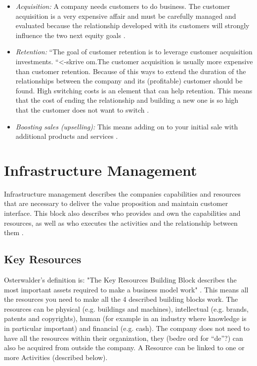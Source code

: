 \begin{itemize}
\renewcommand{\labelitemi}{$\bullet$}
\item \emph{Acquisition:} A company needs customers to do business. The customer acquisition is a very expensive affair and must be carefully managed and evaluated because the relationship developed with its customers will strongly influence the two next equity goals \cite{osterwalderthesis}.
\item \emph{Retention:} “The goal of customer retention is to leverage customer acquisition investments. “<-skrive om.The customer acquisition is usually more expensive than customer retention. Because of this ways to extend the duration of the relationships between the company and its (profitable) customer should be found. High switching costs is an element that can help retention. This means that the cost of ending the relationship and building a new one is so high that the customer does not want to switch \cite{osterwalderthesis}.
\item \emph{Boosting sales (upselling):} This means adding on to your initial sale with additional products and services \cite{osterwalderthesis}.
\end{itemize}

\section{Infrastructure Management}
Infrastructure management describes the companies capabilities and resources that are necessary to deliver the value proposition and maintain customer interface. This block also describes who provides and own the capabilities and resources, as well as who executes the activities and the relationship between them \cite{osterwalderthesis}.

\subsection{Key Resources}
Osterwalder's definition is: "The Key Resources Building Block describes the most important assets required to make a business model work" \cite{osterwalder}. This means all the resources you need to make all the 4 described building blocks work. The resources can be physical (e.g. buildings and machines), intellectual (e.g. brands, patents and copyrights), human (for example in an industry where knowledge is in particular important) and financial (e.g. cash). The company does not need to have all the resources within their organization, they (bedre ord for “de”?) can also be acquired from outside the company. A Resource can be linked to one or more Activities (described below).

